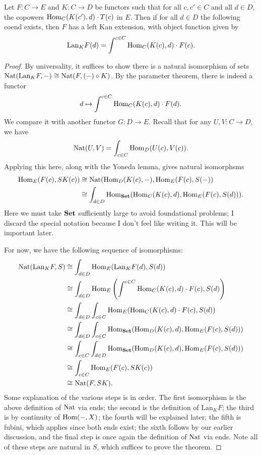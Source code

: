 \begin{theorem}\label{thm:10.3}
	Let $F : C \to E$ and $K : C \to D$ be functors such that for all $c,c'\in C$ and all $d\in D$, the copowers $\operatorname{Hom}_{C}(K(c'), d) \cdot T(c)$ in $E$. Then if for all $d\in D$ the following coend exists, then $F$ has a left Kan extension, with object function given by
	\[
		\mathrm{Lan} _KF(d)=\int^{c\in C} \operatorname{Hom}_{C}(K(c), d) \cdot F(c)
	.\]
\end{theorem}
\begin{proof}
	By universality, it suffices to show there is a natural isomorphism of sets $\operatorname{Nat}(\mathrm{Lan} _KF,-)\cong\operatorname{Nat}(F,(-)\circ K)$. By the parameter theorem, there is indeed a functor
	\[
		d\mapsto \int^{c\in C} \operatorname{Hom}_{C}(K(c), d) \cdot F(d)
	.\]
	We compare it with another functor $G : D \to E$. Recall that for any $U,V : C \to D$, we have
	\[
		\operatorname{Nat}(U,V)=\int_{c\in C} \operatorname{Hom}_{D}(U(c), V(c)) 
	.\]
	Applying this here, along with the Yoneda lemma, gives natural isomorphsms
	\begin{align*}
		\operatorname{Hom}_{E}(F(c), SK(c)) &\cong \operatorname{Nat}(\operatorname{Hom}_{D}(K(c), -) ,\operatorname{Hom}_{E}(F(c), S(-)) \\
				      &\cong \int_{d\in D} \operatorname{Hom}_{\mathbf{Set} }(\operatorname{Hom}_{C}(K(c), d) , \operatorname{Hom}_{E}(F(c), S(d)) ) 
	.\end{align*}
	Here we must take $\mathbf{Set} $ sufficiently large to avoid foundational problems; I discard the special notation because I don't feel like writing it. This will be important later.

	For now, we have the following sequence of isomorphisms:
	\begin{align*}
		\operatorname{Nat}(\mathrm{Lan} _KF,S)&\cong \int_{d\in D} \operatorname{Hom}_{E}(\mathrm{Lan} _KF(d), S(d)) \\
					&\cong \int_{d\in D} \operatorname{Hom}_{E} \left( \int^{c\in C} \operatorname{Hom}_{C}(K(c), d) \cdot F(c), S(d) \right) \\
					&\cong \int_{d\in D} \int_{c\in C} \operatorname{Hom}_{E}(\operatorname{Hom}_{C}(K(c), d)\cdot F(c) , S(d)) \\
					&\cong \int_{d\in D} \int_{c\in C} \operatorname{Hom}_{\mathbf{Set} }(\operatorname{Hom}_{D}(K(c), d) , \operatorname{Hom}_{E}(F(c), S(d)) ) \\
					&\cong \int_{c\in C} \int_{d\in D} \operatorname{Hom}_{\mathbf{Set} }(\operatorname{Hom}_{D}(K(c), d) , \operatorname{Hom}_{E}(F(c), S(d)) ) \\
					&\cong \int_{c\in C} \operatorname{Hom}_{E}(F(c), SK(c)) \\
					&\cong \operatorname{Nat}(F,SK)
	.\end{align*}
	Some explanation of the various steps is in order. The first isomorphism is the above definition of $\operatorname{Nat}$ via ends; the second is the definition of $\mathrm{Lan} _KF$; the third is by continuity of $\operatorname{Hom}(-, X) $; the fourth will be explained later; the fifth is fubini, which applies since both ends exist; the sixth follows by our earlier discussion, and the final step is once again the definition of $\operatorname{Nat}$ via ends. Note all of these steps are natural in $S$, which suffices to prove the theorem.


\end{proof}
